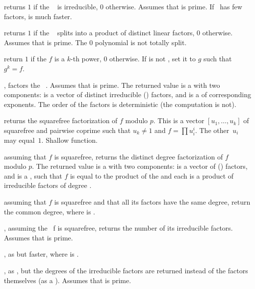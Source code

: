  returns $1$ if the ~
is irreducible, $0$ otherwise. Assumes that  is prime. If~ has
few factors,  is much faster.

 returns $1$ if the
~ splits into a product of distinct linear factors, $0$
otherwise. Assumes that  is prime. The $0$ polynomial is not
totally split.

return $1$ if the  $f$ is a $k$-th power, $0$ otherwise.
If  is not , set it to $g$ such that $g^k = f$.

, factors the ~. Assumes
that  is prime. The returned value  is a  with two
components:  is a vector of distinct irreducible ()
factors, and  is a  of corresponding exponents. The
order of the factors is deterministic (the computation is not).

 returns the squarefree
factorization of $f$ modulo $p$. This is a vector $[u_1,\dots,u_k]$
of squarefree and pairwise coprime  such that $u_k \neq 1$ and $f =
\prod u_i^i$. The other~$u_i$ may equal~$1$.
Shallow function.

 assuming that $f$ is squarefree,
returns the distinct degree factorization of $f$ modulo $p$.
The returned value  is a  with two
components:  is a vector of ()
factors, and  is a , such that
$f$ is equal to the product of the  and each 
is a product of irreducible factors of degree .

 assuming that $f$ is squarefree
and that all its factors have the same degree, return the common degree,
where  is .

, assuming the ~f is squarefree,
returns the number of its irreducible factors. Assumes that  is prime.

, as
 but faster,
where  is .

, as , but the
degrees of the irreducible factors are returned instead of the factors
themselves (as a ). Assumes that  is prime.

